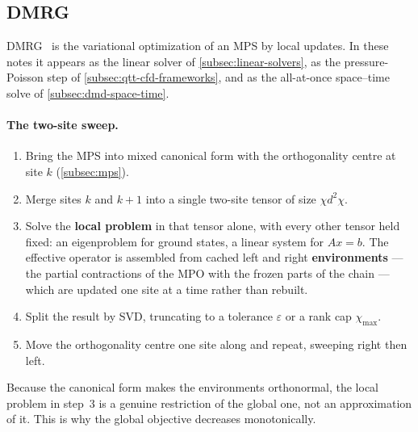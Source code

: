 \subsection{DMRG}
\label{subsec:appendix-dmrg}

DMRG~\cite{White1992,Schollwoeck2011} is the variational optimization of an MPS
by local updates. In these notes it appears as the linear solver of
\cref{subsec:linear-solvers}, as the pressure-Poisson step of
\cref{subsec:qtt-cfd-frameworks}, and as the all-at-once space--time solve of
\cref{subsec:dmd-space-time}.

\paragraph{The two-site sweep.}
\begin{enumerate}
  \item Bring the MPS into mixed canonical form with the orthogonality centre at
    site $k$ (\cref{subsec:mps}).
  \item Merge sites $k$ and $k+1$ into a single two-site tensor of size
    $\chi d^2 \chi$.
  \item Solve the \textbf{local problem} in that tensor alone, with every other
    tensor held fixed: an eigenproblem for ground states, a linear system for
    $Ax = b$. The effective operator is assembled from cached left and right
    \textbf{environments} --- the partial contractions of the MPO with the
    frozen parts of the chain --- which are updated one site at a time rather
    than rebuilt.
  \item Split the result by SVD, truncating to a tolerance $\varepsilon$ or a
    rank cap $\chi_{\max}$.
  \item Move the orthogonality centre one site along and repeat, sweeping right
    then left.
\end{enumerate}

\begin{remark}
  Because the canonical form makes the environments orthonormal, the local
  problem in step~3 is a genuine restriction of the global one, not an
  approximation of it. This is why the global objective decreases monotonically.
\end{remark}


